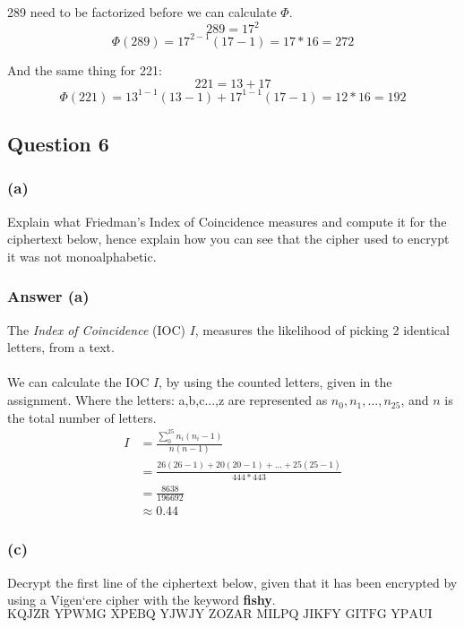\documentclass{article}
\begin{document}
	289 need to be factorized before we can calculate $\Phi$.
	$$
	289 = 17^2
	$$
	$$
	\Phi(289) = 17^{2-1}(17-1) 
	= 17*16 
	= 272
	$$
	
	And the same thing for 221:
	$$
	221 = 13 + 17
	$$
	$$
	\Phi(221) = 13^{1-1}(13-1) + 17^{1-1}(17-1) = 12*16 = 192
	$$
	
	\subsection*{Question 6}
	\subsubsection*{(a)}
	Explain what Friedman’s Index of Coincidence measures and compute it for the
	ciphertext below, hence explain how you can see that the cipher used to encrypt
	it was not monoalphabetic.
	
	\subsubsection*{Answer (a)}
	The \textit{Index of Coincidence} (IOC) $I$, measures the likelihood of picking 2 identical letters, from a text. 
	\\\\
	We can calculate the IOC $I$, by using the counted letters, given in the assignment. Where the  letters: a,b,c...,z are represented as $n_0,n_1,...,n_{25}$, and $n$ is the total number of letters. 
	\[
	\begin{split}
	I &= \frac{\sum_{0}^{25}n_i(n_i-1)}{n(n-1)} \\
	&=\frac{26(26-1)+20(20-1)+...+25(25-1)}{444*443} \\
	&=\frac{8638}{196692} \\
	&\approx0.44
	\end{split}
	\]
	
	\subsubsection*{(c)}
	Decrypt the first line of the ciphertext below, given that it has been encrypted by
	using a Vigen`ere cipher with the keyword \textbf{fishy}.
	$$
	\text{KQJZR YPWMG XPEBQ YJWJY ZOZAR MILPQ JIKFY GITFG YPAUI HWMSB MINLA FCYOR}
	$$
	
\end{document}
